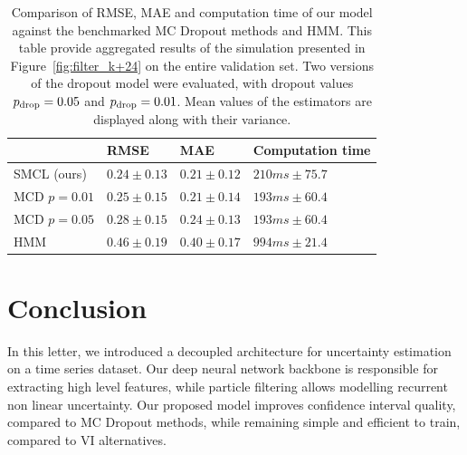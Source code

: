 \documentclass[journal]{IEEEtran}
\begin{document}
\begin{table}[htpb]
	\centering
	\caption{Comparison of RMSE, MAE and computation time of our model against the benchmarked MC Dropout methods and HMM.
		This table provide aggregated results of the simulation presented in Figure~\ref{fig:filter_k+24} on the entire validation set.
		Two versions of the dropout model were evaluated, with dropout values $p_\textnormal{drop}=0.05$ and $p_\textnormal{drop}=0.01$.
		Mean values of the estimators are displayed along with their variance.}
	\label{tab:ci_comparison}
	\begin{tabular}{llll}
		\toprule
		             & RMSE            & MAE             & Computation time  \\
		\toprule
		SMCL (ours)  & $0.24 \pm 0.13$ & $0.21 \pm 0.12$ & $210 ms \pm 75.7$ \\
		MCD $p=0.01$ & $0.25 \pm 0.15$ & $0.21 \pm 0.14$ & $193 ms \pm 60.4$ \\
		MCD $p=0.05$ & $0.28 \pm 0.15$ & $0.24 \pm 0.13$ & $193 ms \pm 60.4$ \\
		HMM          & $0.46 \pm 0.19$ & $0.40 \pm 0.17$ & $994 ms \pm 21.4$ \\
		\bottomrule
	\end{tabular}
\end{table}


\section{Conclusion}%
\label{sec:conclusion}

In this letter, we introduced a decoupled architecture for uncertainty estimation on a time series dataset.
Our deep neural network backbone is responsible for extracting high level features, while particle filtering allows modelling recurrent non linear uncertainty.
Our proposed model improves confidence interval quality, compared to MC Dropout methods, while remaining simple and efficient to train, compared to VI alternatives.
\end{document}
